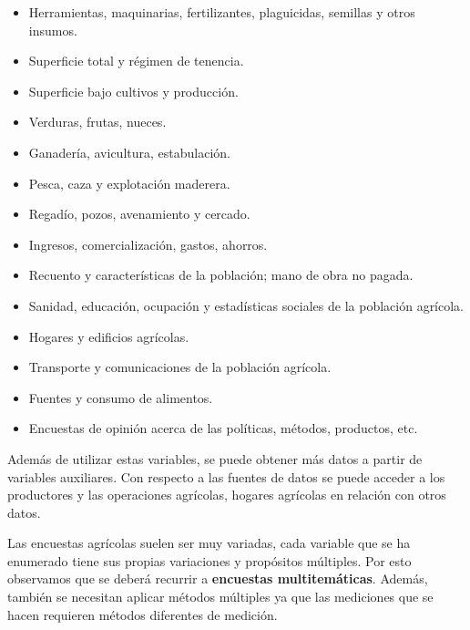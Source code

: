\documentclass{report}
\begin{document}
\begin{itemize}
    \item Herramientas, maquinarias, fertilizantes, plaguicidas, semillas y otros insumos.
    \item Superficie total y régimen de tenencia.
    \item Superficie bajo cultivos y producción.
    \item Verduras, frutas, nueces.
    \item Ganadería, avicultura, estabulación.
    
    \item Pesca, caza y explotación maderera.
    \item Regadío, pozos, avenamiento y cercado.
    \item Ingresos, comercialización, gastos, ahorros.
    \item Recuento y características de la población; mano de obra no pagada.
    \item Sanidad, educación, ocupación y estadísticas sociales de la población agrícola.
    \item Hogares y edificios agrícolas.
    \item Transporte y comunicaciones de la población agrícola.
    \item Fuentes y consumo de alimentos.
    \item Encuestas de opinión acerca de las políticas, métodos, productos, etc.
\end{itemize}

\bigbreak
    
Además de utilizar estas variables, se puede obtener más datos a partir de variables auxiliares. Con respecto a las fuentes de datos se puede acceder a los productores y las operaciones agrícolas, hogares agrícolas en relación con otros datos.

\bigbreak

Las encuestas agrícolas suelen ser muy variadas, cada variable que se ha enumerado tiene sus propias variaciones y propósitos múltiples. Por esto observamos que se deberá recurrir a \textbf{encuestas multitemáticas}. Además, también se necesitan aplicar métodos múltiples ya que las mediciones que se hacen requieren métodos diferentes de medición.
    

\printbibliography
\end{document}
